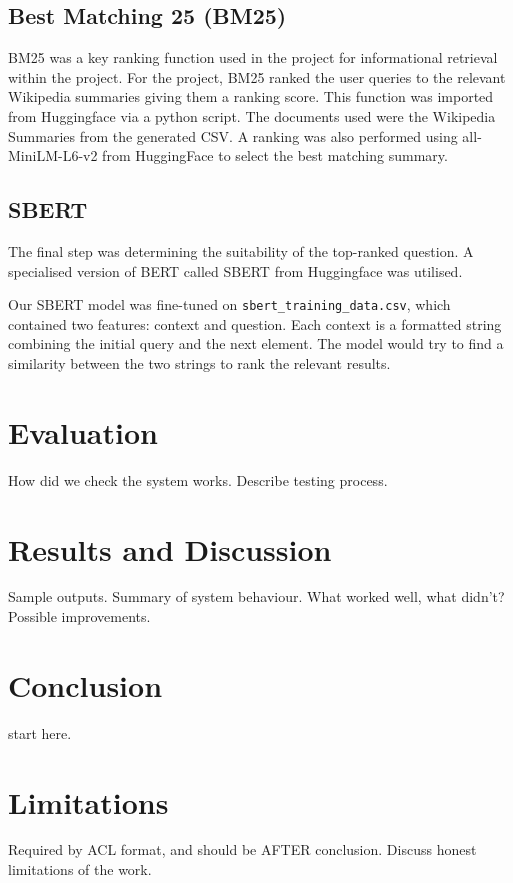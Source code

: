 \documentclass[11pt]{article}
\begin{document}
\subsection{Best Matching 25 (BM25)}
BM25 was a key ranking function used in the project for informational retrieval within the project. For the project, BM25 ranked the user queries to the relevant Wikipedia summaries giving them a ranking score. This function was imported from Huggingface via a python script. 
 \newline
 \newline
The documents used were the Wikipedia Summaries from the generated CSV. A ranking was also performed using all-MiniLM-L6-v2 from HuggingFace to select the best matching summary.


\subsection{SBERT}
The final step was determining the suitability of the top-ranked question. A specialised version of BERT called SBERT from Huggingface was utilised.

Our SBERT model was fine-tuned on \texttt{sbert\_training\_data.csv}, which contained two features: context and question. Each context is a formatted string combining the initial query and the next element. The model would try to find a similarity between the two strings to rank the relevant results.





\section{Evaluation}
How did we check the system works.
Describe testing process.

\section{Results and Discussion}
Sample outputs.
Summary of system behaviour.
What worked well, what didn't?
Possible improvements.

\section{Conclusion}
start here.

\section*{Limitations}
Required by ACL format, and should be AFTER conclusion.
Discuss honest limitations of the work.
\end{document}
